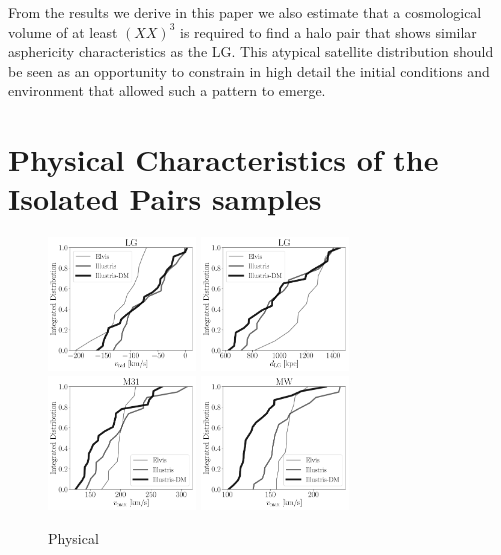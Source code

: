\documentclass[a4paper,fleqn,usenatbib]{mnras}
\begin{document}
From the results we derive in this paper we also estimate that a
cosmological volume of at least $( XX )^3$ is required to find a halo pair
that shows similar asphericity characteristics as the LG. 
This atypical satellite distribution should be seen as an opportunity
to constrain in high detail the initial conditions and environment
that allowed such a pattern to emerge. 










\appendix

\section{Physical Characteristics of the Isolated Pairs samples}

\begin{figure}
\centering
\includegraphics[width=0.35\textwidth]{int_distro_LG_v_rad.pdf}
\includegraphics[width=0.35\textwidth]{int_distro_LG_d.pdf}
\includegraphics[width=0.35\textwidth]{int_distro_M31_vmax.pdf}
\includegraphics[width=0.35\textwidth]{int_distro_MW_vmax.pdf}
\caption{Physical 
\label{fig:physical}}
\end{figure}
\end{document}
